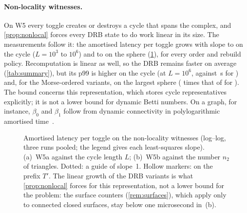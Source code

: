 \paragraph{Non-locality witnesses.}
On W5 every toggle creates or destroys a cycle that spans the complex, and
\cref{prop:nonlocal} forces every DRB state to do work linear in its size. The
measurements follow it: the amortised latency per toggle grows with slope
\NumSlopeESixWFiveCycleDrbIdAmort{} to \NumSlopeESixWFiveCycleDrbIdRbAmort{} on
the cycle ($L=10^3$ to $10^6$) and \NumSlopeESixWFiveSphereDrbIdRbAmort{} to
\NumSlopeESixWFiveSphereMmhmAmort{} on the sphere (\cref{fig:nonlocality}), for
every order and rebuild policy. Recomputation is linear as well, so the DRB
remains faster on average (\cref{tab:summary}), but its p99 is higher on the
cycle (at $L=10^6$, \NumWFiveCycleLOneMillionMmhmPNinetyNine{} against
\NumWFiveCycleLOneMillionFullIdPNinetyNine\,\textmu s for ) and, for
the Morse-ordered variants, on the largest sphere
(\NumWFiveSphereLEightMmhmPNinetyNineOverFullId{} times that of
 for ). The bound concerns this representation,
which stores cycle representatives explicitly; it is not a lower bound for
dynamic Betti numbers. On a graph, for instance, $\beta_0$ and $\beta_1$ follow
from dynamic connectivity in polylogarithmic amortised
time~\cite{holm2001polylog}.

\begin{figure}[t]
  \centering
  \caption{Amortised latency per toggle on the non-locality witnesses
    (log--log, three runs pooled; the legend gives each least-squares slope).
    (a)~W5a against the cycle length $L$; (b)~W5b against the number $n_2$ of
    triangles. Dotted: a guide of slope~1. Hollow markers:  on the
    prefix $T'$. The linear growth of the DRB variants is what
    \cref{prop:nonlocal} forces for this representation, not a lower bound for
    the problem: the surface counters  (\cref{rem:surfaces}),
    which apply only to connected closed surfaces, stay below one microsecond
    in~(b).}
  \label{fig:nonlocality}
\end{figure}

